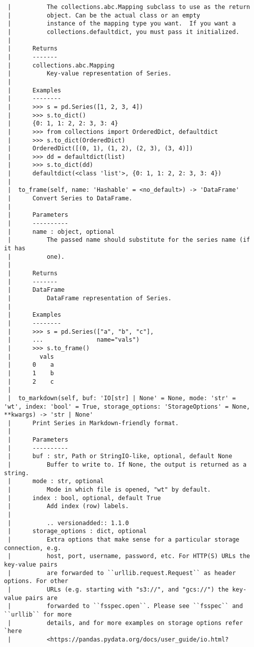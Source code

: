 \documentclass[
  letterpaper,
  DIV=11,
  numbers=noendperiod]{scrreprt}
\begin{document}
\begin{verbatim}
 |          The collections.abc.Mapping subclass to use as the return
 |          object. Can be the actual class or an empty
 |          instance of the mapping type you want.  If you want a
 |          collections.defaultdict, you must pass it initialized.
 |      
 |      Returns
 |      -------
 |      collections.abc.Mapping
 |          Key-value representation of Series.
 |      
 |      Examples
 |      --------
 |      >>> s = pd.Series([1, 2, 3, 4])
 |      >>> s.to_dict()
 |      {0: 1, 1: 2, 2: 3, 3: 4}
 |      >>> from collections import OrderedDict, defaultdict
 |      >>> s.to_dict(OrderedDict)
 |      OrderedDict([(0, 1), (1, 2), (2, 3), (3, 4)])
 |      >>> dd = defaultdict(list)
 |      >>> s.to_dict(dd)
 |      defaultdict(<class 'list'>, {0: 1, 1: 2, 2: 3, 3: 4})
 |  
 |  to_frame(self, name: 'Hashable' = <no_default>) -> 'DataFrame'
 |      Convert Series to DataFrame.
 |      
 |      Parameters
 |      ----------
 |      name : object, optional
 |          The passed name should substitute for the series name (if it has
 |          one).
 |      
 |      Returns
 |      -------
 |      DataFrame
 |          DataFrame representation of Series.
 |      
 |      Examples
 |      --------
 |      >>> s = pd.Series(["a", "b", "c"],
 |      ...               name="vals")
 |      >>> s.to_frame()
 |        vals
 |      0    a
 |      1    b
 |      2    c
 |  
 |  to_markdown(self, buf: 'IO[str] | None' = None, mode: 'str' = 'wt', index: 'bool' = True, storage_options: 'StorageOptions' = None, **kwargs) -> 'str | None'
 |      Print Series in Markdown-friendly format.
 |      
 |      Parameters
 |      ----------
 |      buf : str, Path or StringIO-like, optional, default None
 |          Buffer to write to. If None, the output is returned as a string.
 |      mode : str, optional
 |          Mode in which file is opened, "wt" by default.
 |      index : bool, optional, default True
 |          Add index (row) labels.
 |      
 |          .. versionadded:: 1.1.0
 |      storage_options : dict, optional
 |          Extra options that make sense for a particular storage connection, e.g.
 |          host, port, username, password, etc. For HTTP(S) URLs the key-value pairs
 |          are forwarded to ``urllib.request.Request`` as header options. For other
 |          URLs (e.g. starting with "s3://", and "gcs://") the key-value pairs are
 |          forwarded to ``fsspec.open``. Please see ``fsspec`` and ``urllib`` for more
 |          details, and for more examples on storage options refer `here
 |          <https://pandas.pydata.org/docs/user_guide/io.html?

\end{verbatim}
\end{document}
